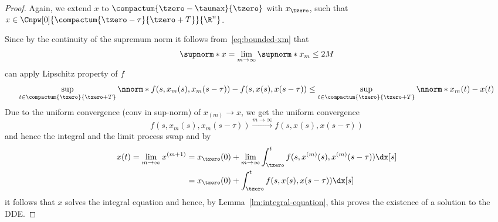\begin{proof}
        Again, we extend $x$ to $\compactum{\tzero-\taumax}{\tzero}$ with $x_\tzero$, such that $x\in\Cnpw[0]{\compactum{\tzero-\tau}{\tzero+T}}{\R^n}$.


        

        Since by the continuity of the supremum norm it follows from~\eqref{eq:bounded-xm} that
        \begin{equation*}
            \supnorm*{x}=\lim_{m\to\infty}\supnorm*{x_m}\leq 2M
        \end{equation*}
        can apply Lipschitz property of $f$
        \begin{equation*}
            \sup_{t\in\compactum{\tzero}{\tzero+T}}\nnorm*{f(s,x_m(s),x_m(s-\tau))-f(s,x(s),x(s-\tau))} \leq \sup_{t\in\compactum{\tzero}{\tzero+T}}\nnorm*{x_m(t)-x(t)}
        \end{equation*}
        Due to the uniform convergence (conv in sup-norm) of $x_{(m)}\to x$, we get the uniform convergence
        \begin{equation*}
            f(s,x_m(s),x_m(s-\tau)) \xrightarrow{m\to\infty} f(s,x(s),x(s-\tau))
        \end{equation*}
        and hence the integral and the limit process swap and by
        \begin{align*}
            x(t) = \lim_{m\to\infty} x^{(m+1)} &= x_\tzero(0) + \lim_{m\to\infty}\int_\tzero^t f(s,x^{(m)}(s),x^{(m)}(s-\tau))\dx[s]\\
            &= x_\tzero(0) + \int_\tzero^t f(s,x(s),x(s-\tau))\dx[s]
        \end{align*}
        it follows that $x$ solves the integral equation and hence, by Lemma~\ref{lm:integral-equation},
        this proves the existence of a solution to the DDE.


\end{proof}
